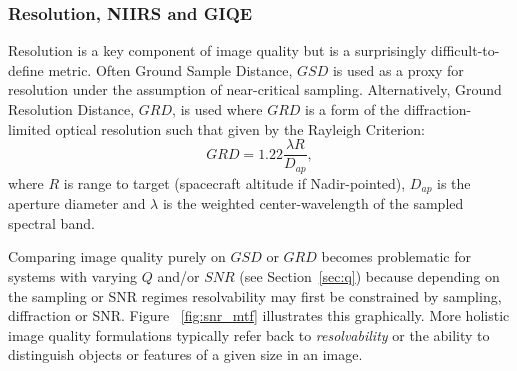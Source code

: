 \documentclass[]{spieman}  %
\begin{document}
\subsubsection{Resolution, NIIRS and GIQE}
Resolution is a key component of image quality but is a surprisingly difficult-to-define metric.  Often Ground Sample Distance, $GSD$ is used as a proxy for resolution under the assumption of near-critical sampling.
Alternatively, Ground Resolution Distance, $GRD$, is used where $GRD$ is a form of the diffraction-limited optical resolution such that given by the Rayleigh Criterion:
\begin{equation}
    GRD = 1.22 \frac{\lambda R}{D_{ap}},
\end{equation}
where $R$ is range to target (spacecraft altitude if Nadir-pointed),  $D_{ap}$ is the aperture diameter and $\lambda$ is the weighted center-wavelength of the sampled spectral band.

Comparing image quality purely on $GSD$ or $GRD$ becomes problematic for systems with varying $Q$ and/or $SNR$ (see Section~\ref{sec:q}) because depending on the sampling or SNR regimes resolvability may first be constrained by sampling, diffraction or SNR.  Figure ~\ref{fig:snr_mtf} illustrates this graphically.  More holistic image quality formulations typically refer back to \emph{resolvability} or the ability to distinguish objects or features of a given size in an image.
\end{document}
